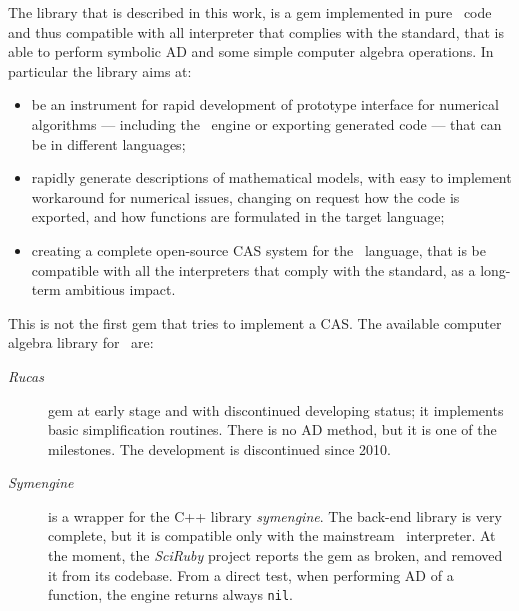 The library that is described in this work, is a gem implemented in pure \Ruby~code and thus compatible with all interpreter that complies with the standard, that is able to perform symbolic AD and some simple computer algebra operations. In particular the library aims at:
\begin{itemize}
  \item be an instrument for rapid development of prototype interface for numerical algorithms --- including the \Mruby~engine or exporting generated code --- that can be in different languages;
  \item rapidly generate descriptions of mathematical models, with easy to implement workaround for numerical issues, changing on request how the code is exported, and how functions are formulated in the target language;
  \item creating a complete open-source CAS system for the \Ruby~language, that is be compatible with all the interpreters that comply with the standard, as a long-term ambitious impact.
\end{itemize}

This is not the first gem that tries to implement a CAS. The available computer algebra library for \Ruby~are:
\begin{description}
  \item [\emph{Rucas}] gem at early stage and with discontinued developing status; it implements basic simplification routines. There is no AD method, but it is one of the milestones. The development is discontinued since 2010.
  \item [\emph{Symengine}] is a wrapper for the C++ library \emph{symengine}. The back-end library is very complete, but it is compatible only with the mainstream \Ruby~interpreter. At the moment, the \emph{SciRuby} project reports the gem as broken, and removed it from its codebase. From a direct test, when performing AD of a function, the engine returns always \texttt{nil}.
\end{description}

